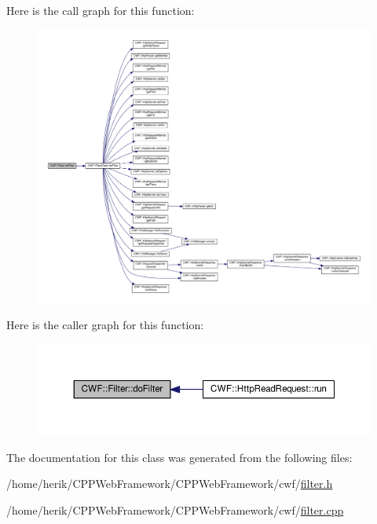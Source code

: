 Here is the call graph for this function\+:
\nopagebreak
\begin{figure}[H]
\begin{center}
\leavevmode
\includegraphics[width=350pt]{class_c_w_f_1_1_filter_aa66add142c4f09a0b26f8d97a59650ba_cgraph}
\end{center}
\end{figure}




Here is the caller graph for this function\+:
\nopagebreak
\begin{figure}[H]
\begin{center}
\leavevmode
\includegraphics[width=350pt]{class_c_w_f_1_1_filter_aa66add142c4f09a0b26f8d97a59650ba_icgraph}
\end{center}
\end{figure}




The documentation for this class was generated from the following files\+:\begin{DoxyCompactItemize}
\item 
/home/herik/\+C\+P\+P\+Web\+Framework/\+C\+P\+P\+Web\+Framework/cwf/\hyperlink{filter_8h}{filter.\+h}\item 
/home/herik/\+C\+P\+P\+Web\+Framework/\+C\+P\+P\+Web\+Framework/cwf/\hyperlink{filter_8cpp}{filter.\+cpp}\end{DoxyCompactItemize}
